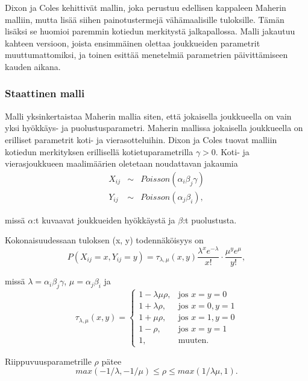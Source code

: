 \documentclass[a4paper,finnish,titlepage,12pt]{article}
\begin{document}
Dixon ja Coles kehittivät mallin, joka perustuu edellisen kappaleen Maherin malliin, mutta lisää siihen painotustermejä vähämaalisille tuloksille. Tämän lisäksi se huomioi paremmin kotiedun merkitystä jalkapallossa. Malli jakautuu kahteen versioon, joista ensimmäinen olettaa joukkueiden parametrit muuttumattomiksi, ja toinen esittää menetelmiä parametrien päivittämiseen kauden aikana.

\subsubsection{Staattinen malli}
Malli yksinkertaistaa Maherin mallia siten, että jokaisella joukkueella on vain yksi hyökkäys- ja puolustusparametri. Maherin mallissa jokaisella joukkueella on erilliset parametrit koti- ja vierasotteluihin. Dixon ja Coles tuovat malliin kotiedun merkityksen erillisellä kotietuparametrilla $\gamma > 0$. Koti- ja vierasjoukkueen maalimäärien oletetaan noudattavan jakaumia
\begin{eqnarray*}
	X_{ij} &\sim& Poisson(\alpha_i \beta_j \gamma) \\
	Y_{ij} &\sim& Poisson(\alpha_j \beta_i),
\end{eqnarray*}

missä $\alpha$:t kuvaavat joukkueiden hyökkäystä ja $\beta$:t puolustusta.

Kokonaisuudessaan tuloksen (x, y) todennäköisyys on
\begin{equation}
	P(X_{ij}=x, Y_{ij}=y) = \tau_{\lambda,\mu} (x, y) \frac{\lambda^x e^{-\lambda}}{x!} \cdot \frac{\mu^y e^{\mu}}{y!},
\end{equation}

missä $\lambda = \alpha_i \beta_j \gamma$, $\mu = \alpha_j \beta_i$ ja 
\begin{equation}
\tau_{\lambda,\mu} (x, y) =
\begin{cases}
1 - \lambda \mu \rho, & \text{jos } x = y = 0 \\
1 + \lambda \rho, & \text{jos } x = 0, y = 1 \\
1 + \mu \rho, & \text{jos } x = 1, y = 0 \\
		1 - \rho, & \text{jos } x = y = 1 \\
		1, & \text{muuten}.
	\end{cases}
\end{equation} 

Riippuvuusparametrille $\rho$ pätee
\begin{equation}
	max(-1/\lambda, -1/\mu) \le \rho \le max(1/\lambda \mu, 1).
\end{equation}
\end{document}
